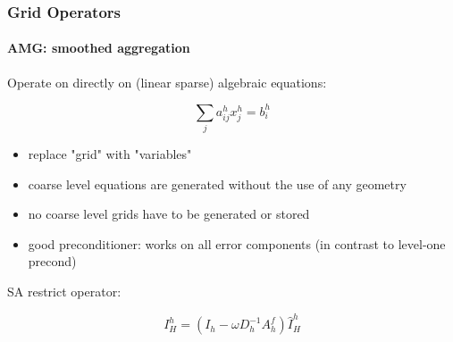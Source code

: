 \documentclass[xcolor=pdftex,table,10pt]{beamer}
\begin{document}
  \begin{frame}
		\frametitle{Grid Operators}
		\framesubtitle{AMG: smoothed aggregation}


		Operate on directly on (linear sparse) algebraic equations:

		\[
			\sum_j a_{ij}^h x_j^h = b_i^h
		\]

		\begin{itemize}
			\item replace "grid" with "variables"
			\item coarse level equations are generated without the use of any geometry
			\item no coarse level grids have to be generated or stored
			\item good preconditioner: works on all error components (in contrast to level-one precond)
		\end{itemize}

		\vspace{0.2cm}
		SA restrict operator:

		\[
			I_H^h = (I_h - \omega D_h^{-1} A_h^f) \hat{I}_H^h
		\]

	
	\end{frame}

%	
%
%	    
\end{document}
